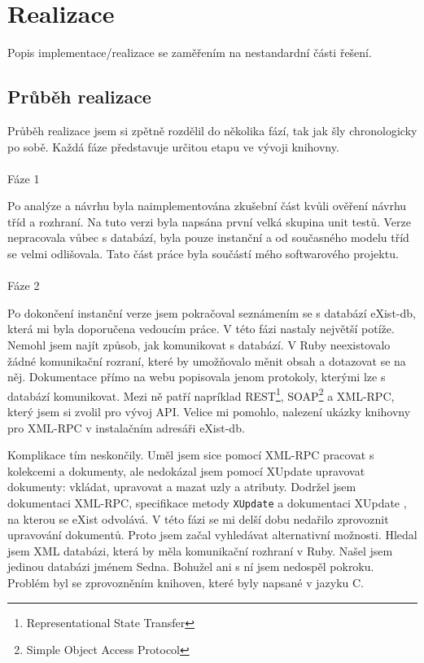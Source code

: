 \chapter{Realizace}
Popis implementace/realizace se zaměřením na nestandardní části řešení.

\section{Průběh realizace}
Průběh realizace jsem si zpětně rozdělil do několika fází, tak jak šly chronologicky po sobě. Každá fáze představuje určitou etapu ve vývoji knihovny.
\\
\\
\noindent Fáze 1

\noindent Po analýze a návrhu byla naimplementována zkušební část kvůli ověření návrhu tříd a rozhraní. Na tuto verzi byla napsána první velká skupina unit testů. Verze nepracovala vůbec s databází, byla pouze instanční a od současného modelu tříd se velmi odlišovala. Tato část práce byla součástí mého softwarového projektu.
\\
\\
\noindent Fáze 2

\noindent Po dokončení instanční verze jsem pokračoval seznámením se s databází eXist-db, která mi byla doporučena vedoucím práce. V této fázi nastaly největší potíže. Nemohl jsem najít způsob, jak komunikovat s databází. V Ruby neexistovalo žádné komunikační rozraní, které by umožňovalo měnit obsah a dotazovat se na něj. Dokumentace přímo na webu \cite{exist:exist} popisovala jenom protokoly, kterými lze s databází komunikovat. Mezi ně patří napríklad REST\footnote{Representational State Transfer}, SOAP\footnote{Simple Object Access Protocol} a XML-RPC, který jsem si zvolil pro vývoj API. Velice mi pomohlo, nalezení ukázky knihovny pro XML-RPC v instalačním adresáři eXist-db. 

Komplikace tím neskončily. Uměl jsem sice pomocí XML-RPC pracovat s kolekcemi a dokumenty, ale nedokázal jsem pomocí XUpdate upravovat dokumenty: vkládat, upravovat a mazat uzly a atributy. Dodržel jsem dokumentaci XML-RPC, specifikace metody \verb|XUpdate| \cite{exist:xmlrpcxupdate} a dokumentaci XUpdate \cite{xupdate}, na kterou se eXist odvolává. V této fázi se mi delší dobu nedařilo zprovoznit upravování dokumentů. Proto jsem začal vyhledávat alternativní možnosti. Hledal jsem XML databázi, která by měla komunikační rozhraní v Ruby. Našel jsem jedinou databázi jménem Sedna. Bohužel ani s ní jsem nedospěl pokroku. Problém byl se zprovozněním knihoven, které byly napsané v jazyku C.

